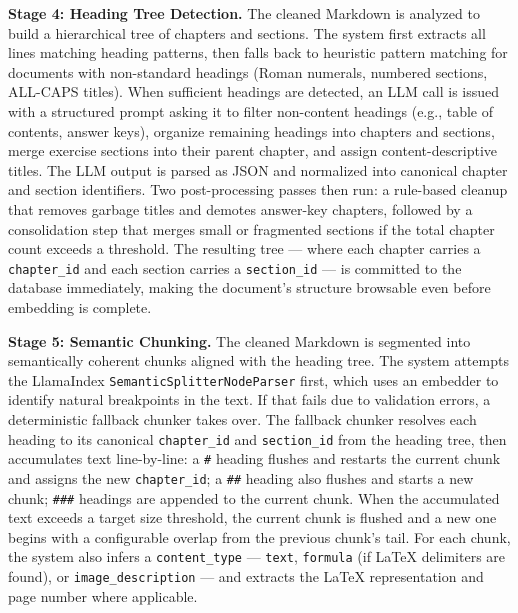 \documentclass[12pt,a4paper]{article}
\begin{document}
\textbf{Stage 4: Heading Tree Detection.} The cleaned Markdown is analyzed to build a hierarchical tree of chapters and sections. The system first extracts all lines matching heading patterns, then falls back to heuristic pattern matching for documents with non-standard headings (Roman numerals, numbered sections, ALL-CAPS titles). When sufficient headings are detected, an LLM call is issued with a structured prompt asking it to filter non-content headings (e.g., table of contents, answer keys), organize remaining headings into chapters and sections, merge exercise sections into their parent chapter, and assign content-descriptive titles. The LLM output is parsed as JSON and normalized into canonical chapter and section identifiers. Two post-processing passes then run: a rule-based cleanup that removes garbage titles and demotes answer-key chapters, followed by a consolidation step that merges small or fragmented sections if the total chapter count exceeds a threshold. The resulting tree — where each chapter carries a \texttt{chapter\_id} and each section carries a \texttt{section\_id} — is committed to the database immediately, making the document's structure browsable even before embedding is complete.

\textbf{Stage 5: Semantic Chunking.} The cleaned Markdown is segmented into semantically coherent chunks aligned with the heading tree. The system attempts the LlamaIndex \texttt{SemanticSplitterNodeParser} first, which uses an embedder to identify natural breakpoints in the text. If that fails due to validation errors, a deterministic fallback chunker takes over. The fallback chunker resolves each heading to its canonical \texttt{chapter\_id} and \texttt{section\_id} from the heading tree, then accumulates text line-by-line: a \texttt{#} heading flushes and restarts the current chunk and assigns the new \texttt{chapter\_id}; a \texttt{##} heading also flushes and starts a new chunk; \texttt{###} headings are appended to the current chunk. When the accumulated text exceeds a target size threshold, the current chunk is flushed and a new one begins with a configurable overlap from the previous chunk's tail. For each chunk, the system also infers a \texttt{content\_type} — \texttt{text}, \texttt{formula} (if LaTeX delimiters are found), or \texttt{image\_description} — and extracts the LaTeX representation and page number where applicable.
\end{document}
